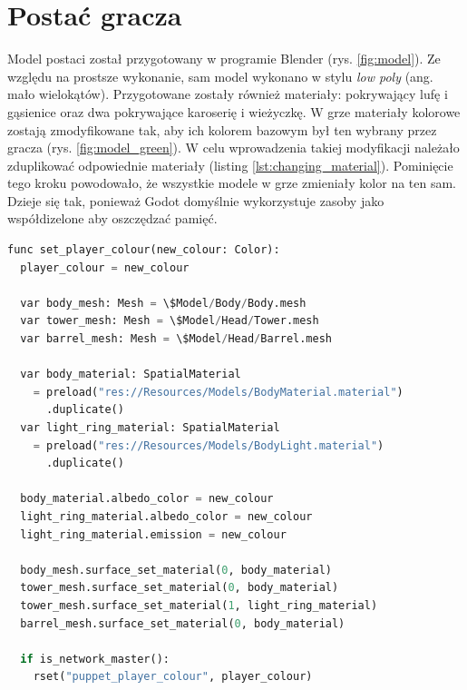\section{Postać gracza}
Model postaci został przygotowany w programie Blender (rys. \ref{fig:model}). Ze względu na prostsze wykonanie, sam model wykonano w stylu \emph{low poly} (ang. mało wielokątów). Przygotowane zostały również materiały: pokrywający lufę i gąsienice oraz dwa pokrywające karoserię i wieżyczkę. W grze materiały kolorowe zostają zmodyfikowane tak, aby ich kolorem bazowym był ten wybrany przez gracza (rys. \ref{fig:model_green}). W celu wprowadzenia takiej modyfikacji należało zduplikować odpowiednie materiały (listing \ref{lst:changing_material}). Pominięcie tego kroku powodowało, że wszystkie modele w grze zmieniały kolor na ten sam. Dzieje się tak, ponieważ Godot domyślnie wykorzystuje zasoby jako współdizelone aby oszczędzać pamięć.

\begin{lstlisting}[language=python,caption=Kod zmieniający kolor materiału postaci gracza., label=lst:changing_material,basicstyle=\footnotesize\ttfamily]
func set_player_colour(new_colour: Color):
  player_colour = new_colour

  var body_mesh: Mesh = \$Model/Body/Body.mesh
  var tower_mesh: Mesh = \$Model/Head/Tower.mesh
  var barrel_mesh: Mesh = \$Model/Head/Barrel.mesh

  var body_material: SpatialMaterial 
    = preload("res://Resources/Models/BodyMaterial.material")
      .duplicate()
  var light_ring_material: SpatialMaterial 
    = preload("res://Resources/Models/BodyLight.material")
      .duplicate()
	
  body_material.albedo_color = new_colour
  light_ring_material.albedo_color = new_colour
  light_ring_material.emission = new_colour

  body_mesh.surface_set_material(0, body_material)
  tower_mesh.surface_set_material(0, body_material)
  tower_mesh.surface_set_material(1, light_ring_material)
  barrel_mesh.surface_set_material(0, body_material)

  if is_network_master():
    rset("puppet_player_colour", player_colour)
\end{lstlisting}

